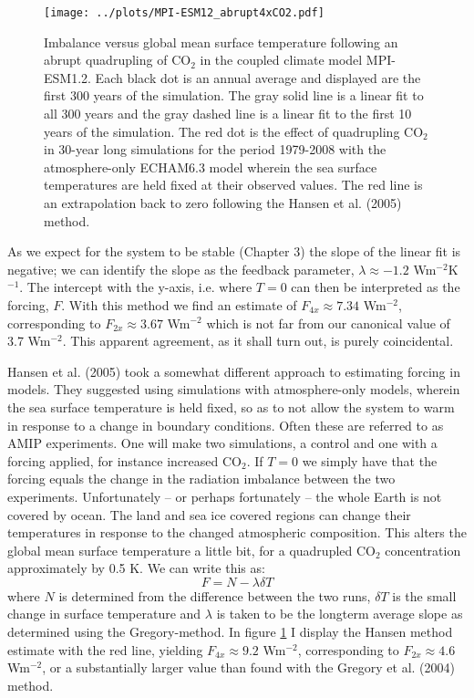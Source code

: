 \documentclass[12pt]{book}
\begin{document}
\begin{figure}[!]
\begin{center}
\texttt{[image: ../plots/MPI-ESM12\_abrupt4xCO2.pdf]}
\end{center}
\caption{ Imbalance versus global mean surface temperature following an abrupt quadrupling of CO$_2$ in the coupled climate model MPI-ESM1.2. Each black dot is an annual average and displayed are the first 300 years of the simulation.  The gray solid line is a linear fit to all 300 years and the gray dashed line is a linear fit to the first 10 years of the simulation. The red dot is the effect of quadrupling CO$_2$ in 30-year long simulations for the period 1979-2008 with the atmosphere-only ECHAM6.3 model wherein the sea surface temperatures are held fixed at their observed values. The red line is an extrapolation back to zero following the Hansen et al. (2005) method. } 
\label{fig:gregory_hansen}
\end{figure}

As we expect for the system to be stable (Chapter 3) the slope of the linear fit is negative; we can identify the slope as the feedback parameter, $\lambda \approx -1.2$ Wm$^{-2}$K$^{-1}$. The intercept with the y-axis, i.e. where $T=0$ can then be interpreted as the forcing, $F$. With this method we find an estimate of $F_{4x} \approx 7.34$ Wm$^{-2}$, corresponding to $F_{2x} \approx 3.67$ Wm$^{-2}$ which is not far from our canonical value of 3.7 Wm$^{-2}$. This apparent agreement, as it shall turn out, is purely coincidental.

Hansen et al. (2005) took a somewhat different approach to estimating forcing in models. They suggested using simulations with atmosphere-only models, wherein the sea surface temperature is held fixed, so as to not allow the system to warm in response to a change in boundary conditions. Often these are referred to as AMIP experiments. One will make two simulations, a control and one with a forcing applied, for instance increased CO$_2$. If $T=0$ we simply have that the forcing equals the change in the radiation imbalance between the two experiments. Unfortunately -- or perhaps fortunately -- the whole Earth is not covered by ocean. The land and sea ice covered regions can change their temperatures in response to the changed atmospheric composition. This alters the global mean surface temperature a little bit, for a quadrupled CO$_2$ concentration approximately by 0.5 K. We can write this as:
$$F = N -\lambda \delta T$$
where $N$ is determined from the difference between the two runs, $\delta T$ is the small change in surface temperature and $\lambda$ is taken to be the longterm average slope as determined using the Gregory-method. In figure \ref{fig:gregory_hansen} I display the Hansen method estimate with the red line, yielding $F_{4x} \approx 9.2$ Wm$^{-2}$, corresponding to $F_{2x} \approx 4.6$ Wm$^{-2}$, or a substantially larger value than found with the Gregory et al. (2004) method.
\end{document}
